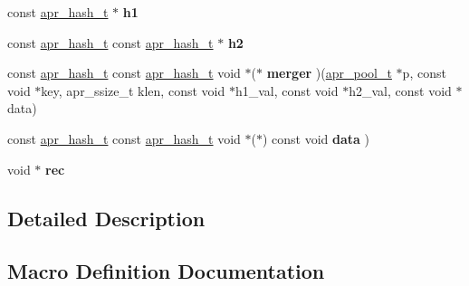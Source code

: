 \begin{DoxyCompactItemize}
const \mbox{\hyperlink{group__apr__hash_ga72ec09b8bde6d874c36bd49df915fff6}{apr\+\_\+hash\+\_\+t}} $\ast$ {\bfseries h1}
\item 
\mbox{\label{group__apr__hash_gaebeb34ebcc8806faa82df3123f4423cf}} 
const \mbox{\hyperlink{group__apr__hash_ga72ec09b8bde6d874c36bd49df915fff6}{apr\+\_\+hash\+\_\+t}} const \mbox{\hyperlink{group__apr__hash_ga72ec09b8bde6d874c36bd49df915fff6}{apr\+\_\+hash\+\_\+t}} $\ast$ {\bfseries h2}
\item 
\mbox{\label{group__apr__hash_gad1c391a8c7b3ceed50df7f2c5445e2e3}} 
const \mbox{\hyperlink{group__apr__hash_ga72ec09b8bde6d874c36bd49df915fff6}{apr\+\_\+hash\+\_\+t}} const \mbox{\hyperlink{group__apr__hash_ga72ec09b8bde6d874c36bd49df915fff6}{apr\+\_\+hash\+\_\+t}} void $\ast$($\ast$ {\bfseries merger} )(\mbox{\hyperlink{group__apr__pools_gaf137f28edcf9a086cd6bc36c20d7cdfb}{apr\+\_\+pool\+\_\+t}} $\ast$p, const void $\ast$key, apr\+\_\+ssize\+\_\+t klen, const void $\ast$h1\+\_\+val, const void $\ast$h2\+\_\+val, const void $\ast$data)
\item 
\mbox{\label{group__apr__hash_gac29b1ff61f790101fde32d55f857b7cc}} 
const \mbox{\hyperlink{group__apr__hash_ga72ec09b8bde6d874c36bd49df915fff6}{apr\+\_\+hash\+\_\+t}} const \mbox{\hyperlink{group__apr__hash_ga72ec09b8bde6d874c36bd49df915fff6}{apr\+\_\+hash\+\_\+t}} void $\ast$($\ast$) const void {\bfseries data} )
\item 
\mbox{\label{group__apr__hash_ga7f7fc1dfc266c4a91490f3ecea7e39c9}} 
void $\ast$ {\bfseries rec}
\end{DoxyCompactItemize}


\subsection{Detailed Description}


\subsection{Macro Definition Documentation}
\mbox{\label{group__apr__hash_ga3ba32541f2717b394000f87f38c7e12d}} 
